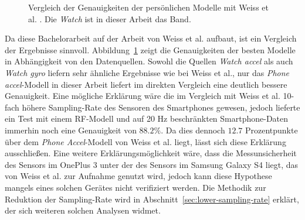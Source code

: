 \begin{figure}
	\centering
	\caption[Vergleich der Genauigkeiten der persönlichen Modelle mit Weiss et al. \cite{Weiss2016}]{Vergleich der Genauigkeiten der persönlichen Modelle mit Weiss et al. \cite{Weiss2016}. Die \textit{Watch} ist in dieser Arbeit das Band.}
	\label{fig:accuracy-personal-vs-weiss}
\end{figure}

Da diese Bachelorarbeit auf der Arbeit von Weiss et al. \cite{Weiss2016} aufbaut, ist ein Vergleich der Ergebnisse sinnvoll. Abbildung~\ref{fig:accuracy-personal-vs-weiss} zeigt die Genauigkeiten der besten Modelle in Abhängigkeit von den Datenquellen. Sowohl die Quellen \textit{Watch accel} als auch \textit{Watch gyro} liefern sehr ähnliche Ergebnisse wie bei Weiss et al., nur das \textit{Phone accel}-Modell in dieser Arbeit liefert im direkten Vergleich eine deutlich bessere Genauigkeit. Eine mögliche Erklärung wäre die im Vergleich mit Weiss et al. 10-fach höhere Sampling-Rate des Sensoren des Smartphones gewesen, jedoch lieferte ein Test mit einem RF-Modell und auf 20 Hz beschränkten Smartphone-Daten immerhin noch eine Genauigkeit von $88.2 \%$. Da dies dennoch $12.7$ Prozentpunkte über dem \textit{Phone Accel}-Modell von Weiss et al. liegt, lässt sich diese Erklärung ausschließen. Eine weitere Erklärungsmöglichkeit wäre, dass die Messunsicherheit des Sensors im OnePlus 3 unter der des Sensors im Samsung Galaxy S4 liegt, das von Weiss et al. zur Aufnahme genutzt wird, jedoch kann diese Hypothese mangels eines solchen Gerätes nicht verifiziert werden. Die Methodik zur Reduktion der Sampling-Rate wird in Abschnitt~\ref{sec:lower-sampling-rate} erklärt, der sich weiteren solchen Analysen widmet.

